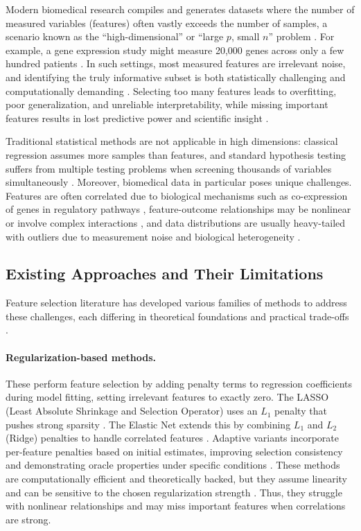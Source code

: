 \documentclass[11pt]{article}
\begin{document}
Modern biomedical research compiles and generates datasets where the number of measured variables
(features) often vastly exceeds the number of samples, a scenario known as the ``high-dimensional''
or ``large $p$, small $n$'' problem \citep{hastie2009,saeys2007}. For example, a gene expression
study might measure 20{,}000 genes across only a few hundred patients \citep{saeys2007}. In such
settings, most measured features are irrelevant noise, and identifying the truly informative subset
is both statistically challenging and computationally demanding
\citep{hastie2009,guyon2003}. Selecting too many features leads to overfitting, poor generalization,
and unreliable interpretability, while missing important features results in lost predictive power
and scientific insight \citep{guyon2003}.

Traditional statistical methods are not applicable in high dimensions: classical regression assumes
more samples than features, and standard hypothesis testing suffers from multiple testing problems
when screening thousands of variables simultaneously \citep{buhlmann2011}. Moreover, biomedical data
in particular poses unique challenges. Features are often correlated due to biological mechanisms
such as co-expression of genes in regulatory pathways \citep{barabasi2011}, feature-outcome
relationships may be nonlinear or involve complex interactions \citep{zhao2014,liu2009}, and data
distributions are usually heavy-tailed with outliers due to measurement noise and biological
heterogeneity \citep{anders2010}.

\subsection{Existing Approaches and Their Limitations}

Feature selection literature has developed various families of methods to address these challenges,
each differing in theoretical foundations and practical trade-offs
\citep{guyon2003,chandrashekar2014,li2017}.

\paragraph{Regularization-based methods.} These perform feature selection by adding penalty terms to
regression coefficients during model fitting, setting irrelevant features to exactly zero. The LASSO
(Least Absolute Shrinkage and Selection Operator) uses an $L_1$ penalty that pushes strong sparsity
\citep{tibshirani1996}. The Elastic Net extends this by combining $L_1$ and $L_2$ (Ridge) penalties
to handle correlated features \citep{zou2005}. Adaptive variants incorporate per-feature penalties
based on initial estimates, improving selection consistency and demonstrating oracle properties under
specific conditions \citep{zou2006}. These methods are computationally efficient and theoretically
backed, but they assume linearity and can be sensitive to the chosen regularization strength
\citep{buhlmann2011}. Thus, they struggle with nonlinear relationships and may miss important
features when correlations are strong.
\end{document}
